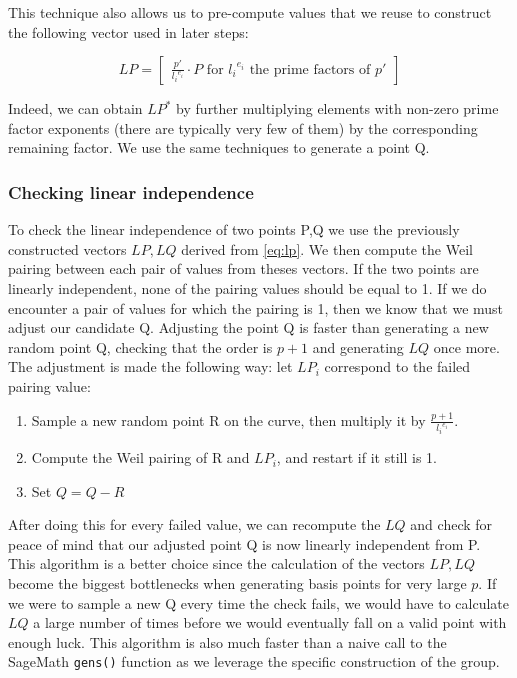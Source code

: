 \documentclass[a4paper,11pt,oneside]{report}
\begin{document}
        This technique also allows us to pre-compute values that we reuse to construct the following vector used in later steps:

        \begin{displaymath}
         \label{eq:lp}
             LP = \begin{bmatrix}\frac{p'}{{l_i}^{e_i}} \cdot P \textrm{  for } {l_i}^{e_i} \textrm{ the prime factors of } p'\end{bmatrix} 
         \end{displaymath}

         Indeed, we can obtain $LP^*$ by further multiplying elements with non-zero prime factor exponents (there are typically very few of them) by the corresponding remaining factor. We use the same techniques to generate a point Q.


        \subsubsection{Checking linear independence}

        To check the linear independence of two points P,Q we use the previously constructed vectors $LP, LQ$ derived from \autoref{eq:lp}. We then compute the Weil pairing between each pair of values from theses vectors. If the two points are linearly independent, none of the pairing values should be equal to 1. If we do encounter a pair of values for which the pairing is 1, then we know that we must adjust our candidate Q. Adjusting the point Q is faster than generating a new random point Q, checking that the order is $p+1$ and generating $LQ$ once more. 
        The adjustment is made the following way: let $LP_i$ correspond to the failed pairing value:

        \begin{enumerate}
            \item Sample a new random point R on the curve, then multiply it by $\frac{p+1}{{l_i}^{e_i}}$.
            \item Compute the Weil pairing of R and $LP_i$, and restart if it still is 1.
            \item Set $Q=Q-R$
        \end{enumerate}

        After doing this for every failed value, we can recompute the $LQ$ and check for peace of mind that our adjusted point Q is now linearly independent from P. This algorithm is a better choice since the calculation of the vectors $LP, LQ$ become the biggest bottlenecks when generating basis points for very large $p$. If we were to sample a new Q every time the check fails, we would have to calculate $LQ$ a large number of times before we would eventually fall on a valid point with enough luck. This algorithm is also much faster than a naive call to the SageMath \texttt{gens()} function as we leverage the specific construction of the group.
        
\end{document}
